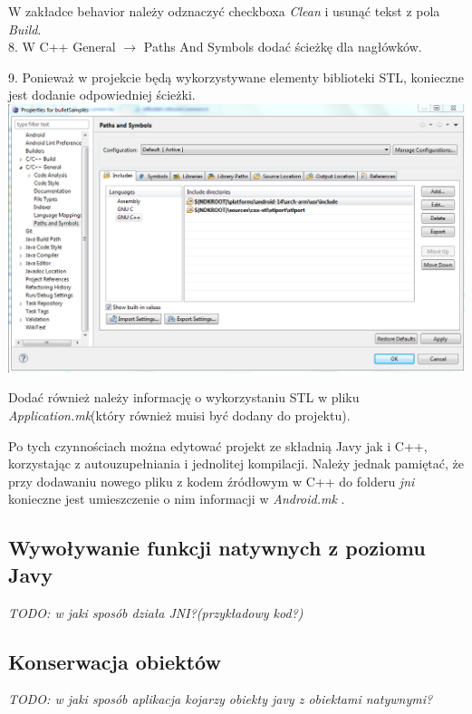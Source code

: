   W zakładce behavior należy odznaczyć checkboxa \emph{Clean} i usunąć tekst z
  pola \emph{Build}.\\
  8. W C++ General $ \rightarrow $ Paths And Symbols dodać ścieżkę dla nagłówków.
 
  9. Ponieważ w projekcie będą wykorzystywane elementy biblioteki STL,
  konieczne jest dodanie odpowiedniej ścieżki.\\
  
  \includegraphics[width=\textwidth]{./img/ndkroot.png}
  
  Dodać również należy informację o wykorzystaniu STL w pliku
  \emph{Application.mk}(który również muisi być dodany do projektu).
  
  
  
  Po tych czynnościach można edytować projekt ze składnią Javy jak i C++,
  korzystając z autouzupełniania i jednolitej kompilacji. Należy jednak
  pamiętać, że przy dodawaniu nowego pliku z kodem źródłowym w C++ do folderu
  \emph{jni} konieczne jest umieszczenie o nim informacji w \emph{Android.mk} .

\subsection{Wywoływanie funkcji natywnych z poziomu Javy}
\emph{TODO: w jaki sposób działa JNI?(przykładowy kod?)}

\subsection{Konserwacja obiektów}
\emph{TODO: w jaki sposób aplikacja kojarzy obiekty javy z obiektami natywnymi?}

